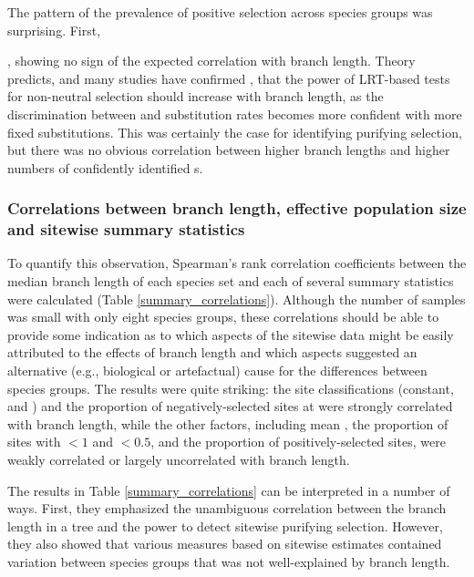 The pattern of the prevalence of positive selection across species
groups was surprising. First, 

, showing no sign of the expected correlation with
branch length. Theory predicts, and many studies have confirmed
\citep{Anisimova2001,Anisimova2002,Massingham2005}, that the power of LRT-based tests
for non-neutral selection should increase with branch length, as the
discrimination between \nsyn and \syn substitution rates becomes more
confident with more fixed substitutions. This was certainly the case
for identifying purifying selection, but there was no obvious
correlation between higher branch lengths and higher numbers of
confidently identified \psc{}s.

\subsubsection{Correlations between branch length, effective population size and sitewise summary statistics}


To quantify this observation, Spearman's rank correlation coefficients
between the median branch length of each species set and each of
several summary statistics were calculated (Table
\ref{summary_correlations}). Although the number of samples was small
with only eight species groups, these correlations should be able to
provide some indication as to which aspects of the sitewise data might
be easily attributed to the effects of branch length and which aspects
suggested an alternative (e.g., biological or artefactual) cause for
the differences between species groups. The results were quite
striking: the site classifications (constant, \syn and \nsyn) and the
proportion of negatively-selected sites at  were
strongly correlated with branch length, while the other factors,
including mean \omgml, the proportion of sites with \omgml$<1$ and
\omgml$<0.5$, and the proportion of positively-selected sites, were
weakly correlated or largely uncorrelated with branch length.

The results in Table \ref{summary_correlations} can be interpreted
in a number of ways. First, they emphasized the unambiguous
correlation between the branch length in a tree and the power to
detect sitewise purifying selection. However, they also showed that
various measures based on sitewise estimates contained variation
between species groups that was not well-explained by branch length. 

